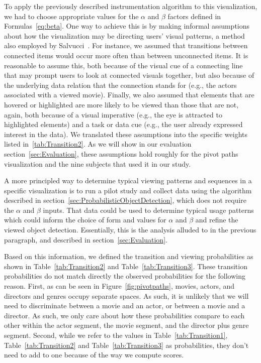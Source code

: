 To apply the previously described instrumentation algorithm to this visualization, we had to choose appropriate values for the $\alpha$ and $\beta$ factors defined in Formulas~\ref{eq:beta}. One way to achieve this is by making informal assumptions about how the visualization may be directing users' visual patterns, a method also employed by Salvucci~\cite{salvucci2000intelligent}. For instance, we assumed that transitions between connected items would occur more often than between unconnected items. It is reasonable to assume this, both because of the visual cue of a connecting line that may prompt users to look at connected visuals together, but also because of the underlying data relation that the connection stands for (e.g., the actors associated with a viewed movie). Finally, we also assumed that elements that are hovered or highlighted are more likely to be viewed than those that are not, again, both because of a visual imperative (e.g., the eye is attracted to highlighted elements) and a task or data cue (e.g., the user already expressed interest in the data). We translated these assumptions into the specific weights listed in~\ref{tab:Transition2}. As we will show in our evaluation section~\ref{sec:Evaluation}, these assumptions hold roughly for the pivot paths visualization and the nine subjects that used it in our study.

A more principled way to determine typical viewing patterns and sequences in a specific visualization is to run a pilot study and collect data using the algorithm described in section~\ref{sec:ProbabilisticObjectDetection}, which does not require the $\alpha$ and $\beta$ inputs. That data could be used to determine typical usage patterns which could inform the choice of form and values for $\alpha$ and $\beta$ and refine the viewed object detection. Essentially, this is the analysis alluded to in the previous paragraph, and described in section~\ref{sec:Evaluation}. 

Based on this information, we defined the transition and viewing probabilities as shown in Table~\ref{tab:Transition2} and Table~\ref{tab:Transition3}. These transition probabilities do not match directly the observed probabilities for the following reason. First, as can be seen in Figure~\ref{fig:pivotpaths}, movies, actors, and directors and genres occupy separate spaces. As such, it is unlikely that we will need to discriminate between a movie and an actor, or between a movie and a director. As such, we only care about how these probabilities compare to each other within the actor segment, the movie segment, and the director plus genre segment. Second, while we refer to the values in Table~\ref{tab:Transition1}, Table~\ref{tab:Transition2} and Table~\ref{tab:Transition3} as probabilities, they don't need to add to one because of the way we compute scores. 


